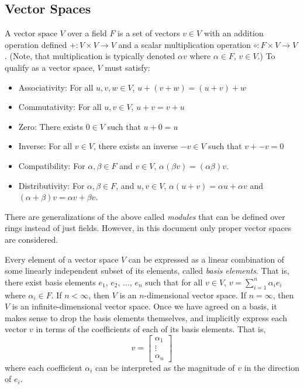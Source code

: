 \documentclass[12pt]{article}
\begin{document}
\subsection*{Vector Spaces}

A vector space $V$ over a field $F$ is a set of vectors $v\in V$
with an addition operation defined $+ : V \times V \rightarrow V$
and a scalar multiplication operation $\circ : F \times V \rightarrow V$.
(Note, that multiplication is typically denoted $\alpha v$ where $\alpha\in F$,
$v\in V$.)
To qualify as a vector space, $V$ must satisfy:
\begin{itemize}
\item Associativity: For all $u,v,w\in V$, $u+(v+w) = (u+v)+w$
\item Commutativity: For all $u,v\in V$, $u+v = v+u$
\item Zero: There exists $0 \in V$ such that $u+0 = u$
\item Inverse: For all $v\in V$, there exists an inverse $-v\in V$
such that $v + -v = 0$
\item Compatibility: For $\alpha,\beta \in F$ and $v\in V$, 
$\alpha (\beta v) = (\alpha\beta) v$.
\item Distributivity: For $\alpha,\beta\in F$, and $u,v\in V$,
$\alpha(u+v) = \alpha u + \alpha v$ and
$(\alpha + \beta)v = \alpha v + \beta v$.
\end{itemize}
There are generalizations of the above called {\it modules} that can be 
defined over rings instead of just fields.
However, in this document only proper vector spaces are considered.

Every element of a vector space $V$ can be expressed as a linear combination
of some linearly independent subset of its elements, called 
{\it basis elements}.
That is, there exist basis elements $e_1$, $e_2$, $\ldots$, $e_n$
such that for all $v\in V$, $v = \sum_{i=1}^n \alpha_i e_i$
where $\alpha_i \in F$.
If $n <\infty$, then $V$ is an $n$-dimensional vector space.
If $n = \infty$, then $V$ is an infinite-dimensional vector space.
Once we have agreed on a basis, it makes sense to drop the basis elements
themselves, and implicitly express each vector $v$ in terms of the 
coefficients of each of its basis elements.
That is, 
$$v = \left[\begin{array}{c} \alpha_1 \\ \vdots \\ \alpha_n\end{array}\right]$$
where each coefficient $\alpha_i$ can be interpreted as the magnitude of $v$
in the direction of $e_i$.
\end{document}
